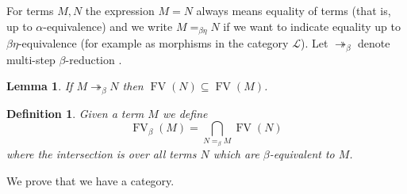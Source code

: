 \documentclass[english,letter paper,12pt,leqno]{article}
\newcommand{\call}[1]{\mathcal{#1}}
\def\ldot{\,.\,}
\def\FV{\operatorname{FV}}
\def\ldot{\,.\,}
\def\FV{\operatorname{FV}}
\newtheorem{lemma}[theorem]{Lemma}
\theoremstyle{example}
\newtheorem{definition}[theorem]{Definition}
\numberwithin{equation}{section}
\def\ldot{\,.\,}
\def\FV{\operatorname{FV}}
\begin{document}
For terms $M,N$ the expression $M = N$ always means equality of terms (that is, up to $\alpha$-equivalence) and we write $M =_{\beta\eta} N$ if we want to indicate equality up to $\beta\eta$-equivalence (for example as morphisms in the category $\call{L}$). Let $\twoheadrightarrow_\beta$ denote multi-step $\beta$-reduction \cite[Definition 1.3.3]{sorensen}.

\begin{lemma}\label{lemma:beta_reduce_FV} If $M \twoheadrightarrow_\beta N$ then $\FV(N) \subseteq \FV(M)$.
\end{lemma}

\begin{definition} Given a term $M$ we define
	\[
	\FV_\beta(M) = \bigcap_{N =_{\beta} M} \FV(N)
	\]
	where the intersection is over all terms $N$ which are $\beta$-equivalent to $M$. 
\end{definition}

We prove that we have a category.
\end{document}
